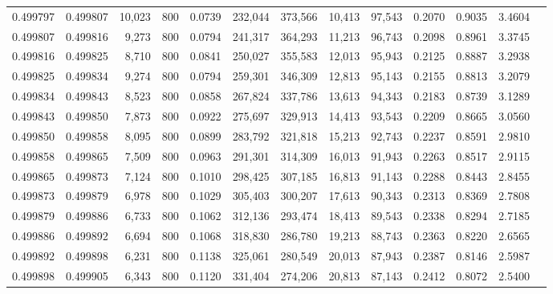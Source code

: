 \begin{tabular}{rrrrrrrrrrrrr}
0.499797 & 0.499807 & 10,023 &   800 &                                     0.0739 & 232,044 & 373,566 &  10,413 &  97,543 & 0.2070 & 0.9035 & 3.4604 \\
0.499807 & 0.499816 &  9,273 &   800 &                                     0.0794 & 241,317 & 364,293 &  11,213 &  96,743 & 0.2098 & 0.8961 & 3.3745 \\
0.499816 & 0.499825 &  8,710 &   800 &                                     0.0841 & 250,027 & 355,583 &  12,013 &  95,943 & 0.2125 & 0.8887 & 3.2938 \\
0.499825 & 0.499834 &  9,274 &   800 &                                     0.0794 & 259,301 & 346,309 &  12,813 &  95,143 & 0.2155 & 0.8813 & 3.2079 \\
0.499834 & 0.499843 &  8,523 &   800 &                                     0.0858 & 267,824 & 337,786 &  13,613 &  94,343 & 0.2183 & 0.8739 & 3.1289 \\
0.499843 & 0.499850 &  7,873 &   800 &                                     0.0922 & 275,697 & 329,913 &  14,413 &  93,543 & 0.2209 & 0.8665 & 3.0560 \\
0.499850 & 0.499858 &  8,095 &   800 &                                     0.0899 & 283,792 & 321,818 &  15,213 &  92,743 & 0.2237 & 0.8591 & 2.9810 \\
0.499858 & 0.499865 &  7,509 &   800 &                                     0.0963 & 291,301 & 314,309 &  16,013 &  91,943 & 0.2263 & 0.8517 & 2.9115 \\
0.499865 & 0.499873 &  7,124 &   800 &                                     0.1010 & 298,425 & 307,185 &  16,813 &  91,143 & 0.2288 & 0.8443 & 2.8455 \\
0.499873 & 0.499879 &  6,978 &   800 &                                     0.1029 & 305,403 & 300,207 &  17,613 &  90,343 & 0.2313 & 0.8369 & 2.7808 \\
0.499879 & 0.499886 &  6,733 &   800 &                                     0.1062 & 312,136 & 293,474 &  18,413 &  89,543 & 0.2338 & 0.8294 & 2.7185 \\
0.499886 & 0.499892 &  6,694 &   800 &                                     0.1068 & 318,830 & 286,780 &  19,213 &  88,743 & 0.2363 & 0.8220 & 2.6565 \\
0.499892 & 0.499898 &  6,231 &   800 &                                     0.1138 & 325,061 & 280,549 &  20,013 &  87,943 & 0.2387 & 0.8146 & 2.5987 \\
0.499898 & 0.499905 &  6,343 &   800 &                                     0.1120 & 331,404 & 274,206 &  20,813 &  87,143 & 0.2412 & 0.8072 & 2.5400 \\

\end{tabular}
